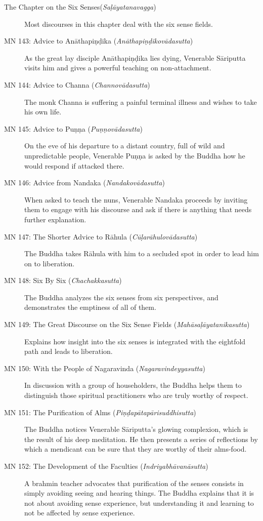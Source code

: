 \documentclass[12pt,openany]{book}%
\begin{document}
\begin{description}
\item[The Chapter on the Six Senses(\textit{\textsanskrit{Saḷāyatanavagga}})] Most discourses in this chapter deal with the six sense fields.%
\item[MN 143: Advice to \textsanskrit{Anāthapiṇḍika} (\textit{\textsanskrit{Anāthapiṇḍikovādasutta}})] As the great lay disciple \textsanskrit{Anāthapiṇḍika} lies dying, Venerable \textsanskrit{Sāriputta} visits him and gives a powerful teaching on non-attachment.%
\item[MN 144: Advice to Channa (\textit{\textsanskrit{Channovādasutta}})] The monk Channa is suffering a painful terminal illness and wishes to take his own life.%
\item[MN 145: Advice to \textsanskrit{Puṇṇa} (\textit{\textsanskrit{Puṇṇovādasutta}})] On the eve of his departure to a distant country, full of wild and unpredictable people, Venerable \textsanskrit{Puṇṇa} is asked by the Buddha how he would respond if attacked there.%
\item[MN 146: Advice from Nandaka (\textit{\textsanskrit{Nandakovādasutta}})] When asked to teach the nuns, Venerable Nandaka proceeds by inviting them to engage with his discourse and ask if there is anything that needs further explanation.%
\item[MN 147: The Shorter Advice to \textsanskrit{Rāhula} (\textit{\textsanskrit{Cūḷarāhulovādasutta}})] The Buddha takes \textsanskrit{Rāhula} with him to a secluded spot in order to lead him on to liberation.%
\item[MN 148: Six By Six (\textit{\textsanskrit{Chachakkasutta}})] The Buddha analyzes the six senses from six perspectives, and demonstrates the emptiness of all of them.%
\item[MN 149: The Great Discourse on the Six Sense Fields (\textit{\textsanskrit{Mahāsaḷāyatanikasutta}})] Explains how insight into the six senses is integrated with the eightfold path and leads to liberation.%
\item[MN 150: With the People of Nagaravinda (\textit{\textsanskrit{Nagaravindeyyasutta}})] In discussion with a group of householders, the Buddha helps them to distinguish those spiritual practitioners who are truly worthy of respect.%
\item[MN 151: The Purification of Alms (\textit{\textsanskrit{Piṇḍapātapārisuddhisutta}})] The Buddha notices Venerable \textsanskrit{Sāriputta}’s glowing complexion, which is the result of his deep meditation. He then presents a series of reflections by which a mendicant can be sure that they are worthy of their alms-food.%
\item[MN 152: The Development of the Faculties (\textit{\textsanskrit{Indriyabhāvanāsutta}})] A brahmin teacher advocates that purification of the senses consists in simply avoiding seeing and hearing things. The Buddha explains that it is not about avoiding sense experience, but understanding it and learning to not be affected by sense experience.%
\end{description}
\end{document}
